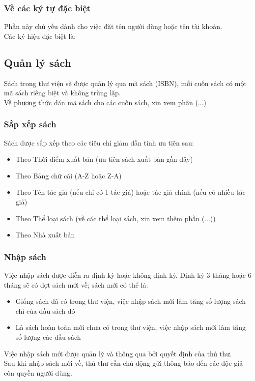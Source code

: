 \documentclass[12pt,a4paper]{report}
\begin{document}
			\subsubsection{Về các ký tự đặc biệt}
			Phần này chủ yếu dành cho việc đăt tên người dùng hoặc tên tài khoản.\\
			Các ký hiệu đặc biệt là: %
		\subsection{Quản lý sách}
			Sách trong thư viện sẽ được quản lý qua mã sách (ISBN), mỗi cuốn sách có một mã sách riêng biệt và không trùng lặp.\\
			Về phương thức dán mã sách cho các cuốn sách, xin xem phần (...)\\
			\subsubsection{Sắp xếp sách}
			Sách được sắp xếp theo các tiêu chí giảm dần tính ưu tiên sau:
			\begin{itemize}
				\item Theo Thời điểm xuất bản (ưu tiên sách xuất bản gần đây)
				\item Theo Bảng chữ cái (A-Z hoặc Z-A)
				\item Theo Tên tác giả (nếu chỉ có 1 tác giả) hoặc tác giả chính (nếu có nhiều tác giả)
				\item Theo Thể loại sách (về các thể loại sách, xin xem thêm phần (...))
				\item Theo Nhà xuất bản
			\end{itemize}

			\subsubsection{Nhập sách}
			Việc nhập sách được diễn ra định kỳ hoặc không định kỳ. Định kỳ 3 tháng hoặc 6 tháng sẽ có đợt sách mới về; sách mới có thể là:
			\begin{itemize}
				\item Giống sách đã có trong thư viện, việc nhập sách mới làm tăng số lượng sách chỉ của đầu sách đó
				\item Là sách hoàn toàn mới chưa có trong thư viện, việc nhập sách mới làm tăng số lượng các đầu sách
			\end{itemize}
			Việc nhập sách mới được quản lý và thông qua bởi quyết định của thủ thư.\\
			Sau khi nhập sách mới về, thủ thư cần chủ động gửi thông báo đến các độc giả còn quyền người dùng.\\
\end{document}
